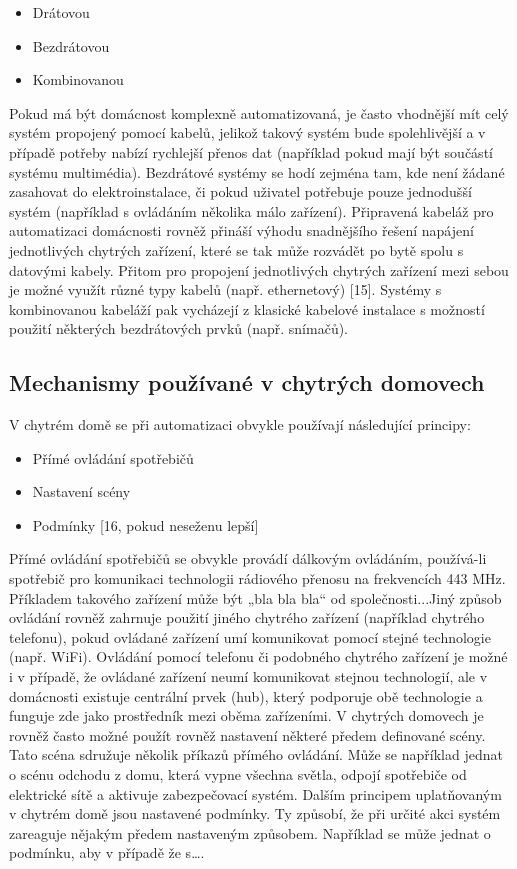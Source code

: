 \begin{itemize}
\item Drátovou
\item Bezdrátovou 
\item Kombinovanou
\end{itemize}
Pokud má být domácnost komplexně automatizovaná, je často vhodnější mít celý systém propojený pomocí kabelů, jelikož takový systém bude spolehlivější a v případě potřeby nabízí rychlejší přenos dat (například pokud mají být součástí systému multimédia). Bezdrátové systémy se hodí zejména tam, kde není žádané zasahovat do elektroinstalace, či pokud uživatel potřebuje pouze jednodušší systém (například s ovládáním několika málo zařízení). Připravená kabeláž pro automatizaci domácnosti rovněž přináší výhodu snadnějšího řešení napájení jednotlivých chytrých zařízení, které se tak může rozvádět po bytě spolu s datovými kabely. Přitom pro propojení jednotlivých chytrých zařízení mezi sebou je možné využít různé typy kabelů (např. ethernetový) [15]. Systémy s kombinovanou kabeláží pak vycházejí z klasické kabelové instalace s možností použití některých bezdrátových prvků (např. snímačů).


\subsection*{Mechanismy používané v chytrých domovech}
V chytrém domě se při automatizaci obvykle používají následující principy:

\begin{itemize}
\item Přímé ovládání spotřebičů
\item Nastavení scény
\item Podmínky [16, pokud neseženu lepší]
\end{itemize}
Přímé ovládání spotřebičů se obvykle provádí dálkovým ovládáním, používá-li spotřebič pro komunikaci technologii rádiového přenosu na frekvencích 443 MHz. Příkladem takového zařízení může být „bla bla bla“ od společnosti...Jiný způsob ovládání rovněž zahrnuje použití jiného chytrého zařízení (například chytrého telefonu), pokud ovládané zařízení umí komunikovat pomocí stejné technologie (např. WiFi). Ovládání pomocí telefonu či podobného chytrého zařízení je možné i v případě, že ovládané zařízení neumí komunikovat stejnou technologií, ale v domácnosti existuje centrální prvek (hub), který podporuje obě technologie a funguje zde jako prostředník mezi oběma zařízeními. \newline
V chytrých domovech je rovněž často možné použít rovněž nastavení některé předem definované scény. Tato scéna sdružuje několik příkazů přímého ovládání. Může se například jednat o scénu odchodu z domu, která vypne všechna světla, odpojí spotřebiče od elektrické sítě a aktivuje zabezpečovací systém.\newline
Dalším principem uplatňovaným v chytrém domě jsou nastavené podmínky. Ty způsobí, že při určité akci systém zareaguje nějakým předem nastaveným způsobem. Například se může jednat o podmínku, aby v případě že s….\newline

